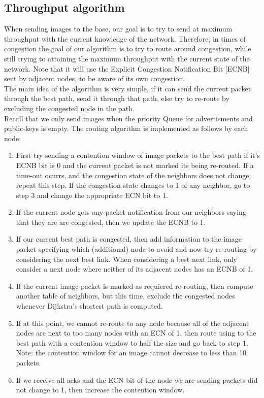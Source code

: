 \documentclass[letterpaper]{article}
\begin{document}
\subsection{Throughput algorithm}

When sending images to the base, our goal is to try to send at maximum throughput with the current knowledge
of the network. Therefore, in times of congestion the goal of our algorithm is to try to route around 
congestion, while still trying to attaining the maximum throughput with the current state of the network. 
Note that it will use the Explicit Congestion Notification Bit [ECNB] sent by adjacent nodes, to be aware of 
its own congestion.\\ 

The main idea of the algorithm is very simple, if it can send the current packet through the best path, send 
it through that path, else try to re-route by excluding the congested node in the path.\\

Recall that we only send images when the priority Queue for advertisments and public-keys is empty. The
routing algorithm is implemented as follows by each node:

\begin{enumerate}
  \item First try sending a contention window of image packets to the best path if it's ECNB bit is 0 and the
  current packet is not marked its being re-routed. If a time-out ocurrs, and the congestion state of the 
  neighbors does not change, repeat this step. If the congestion state changes to 1 of any neighbor, go to
  step 3 and change the appropriate ECN bit to 1.
  \item If the current node gets any packet notification from our neighbors saying that they are are 
  congested, then we update the ECNB to 1.
  \item If our current best path is congested, then add information to the image packet specifying which
  (additional) node to avoid and now try re-routing by considering the next best link. When considering a 
  best next link, only consider a next node where neither of its adjacent nodes has an ECNB of 1. 
  \item If the current image packet is marked as requiered re-routing, then compute another table of 
  neighbors, but this time, exclude the congested nodes whenever Dijkstra's shortest path is computed.
  \item If at this point, we cannot re-route to any node because all of the adjacent nodes are next to too 
  many nodes with an ECN of 1, then route using to the best path with a contention window to half the size 
  and go back to step 1. Note: the contention window for an image cannot decrease to less than 10 packets.
  \item If we receive all acks and the ECN bit of the node we are sending packets did not change to 1, then
  increase the contention window.
\end{enumerate}
\end{document}
